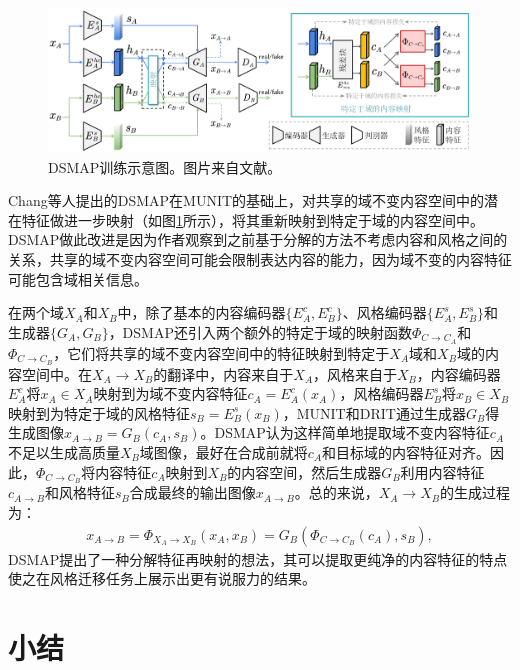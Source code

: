 \begin{figure}[ht]
    \centering
	\includegraphics[width=\textwidth]{figs/DSMAP.pdf}
	\caption{DSMAP训练示意图。图片来自文献\cite{chang2020domain}。}
	\label{fig:DSMAP}
\end{figure}

Chang等人\cite{chang2020domain}提出的DSMAP在MUNIT的基础上，对共享的域不变内容空间中的潜在特征做进一步映射（如图\ref{fig:DSMAP}所示），将其重新映射到特定于域的内容空间中。DSMAP做此改进是因为作者观察到之前基于分解的方法不考虑内容和风格之间的关系，共享的域不变内容空间可能会限制表达内容的能力，因为域不变的内容特征可能包含域相关信息。

在两个域$X_A$和$X_B$中，除了基本的内容编码器$\{E_A^c, E_B^c\}$、风格编码器$\{E_A^s, E_B^s\}$和生成器$\{G_A, G_B\}$，DSMAP还引入两个额外的特定于域的映射函数$\Phi_{C\to C_A}$和$\Phi_{C\to C_B}$，它们将共享的域不变内容空间中的特征映射到特定于$X_A$域和$X_B$域的内容空间中。在$X_A\to X_B$的翻译中，内容来自于$X_A$，风格来自于$X_B$，内容编码器$E_A^c$将$x_A\in X_A$映射到为域不变内容特征$c_A=E_A^c(x_A)$，风格编码器$E_B^s$将$x_B\in X_B$映射到为特定于域的风格特征$s_B=E_B^s(x_B)$，MUNIT和DRIT通过生成器$G_B$得生成图像$x_{A\to B}=G_B(c_A, s_B)$。DSMAP认为这样简单地提取域不变内容特征$c_A$不足以生成高质量$X_B$域图像，最好在合成前就将$c_A$和目标域的内容特征对齐。因此，$\Phi_{C\to C_B}$将内容特征$c_A$映射到$X_B$的内容空间，然后生成器$G_B$利用内容特征$c_{A\to B}$和风格特征$s_B$合成最终的输出图像$x_{A\to B}$。总的来说，$X_A\to X_B$的生成过程为：
\begin{equation}
\begin{split} 
x_{A\to B}=\Phi_{X_A\to X_B}(x_A, x_B)=G_B(\Phi_{C\to C_B}(c_A), s_B),
\end{split}
\label{eq:DSMAP}
\end{equation}
DSMAP提出了一种分解特征再映射的想法，其可以提取更纯净的内容特征的特点使之在风格迁移任务上展示出更有说服力的结果。

\section{小结}

